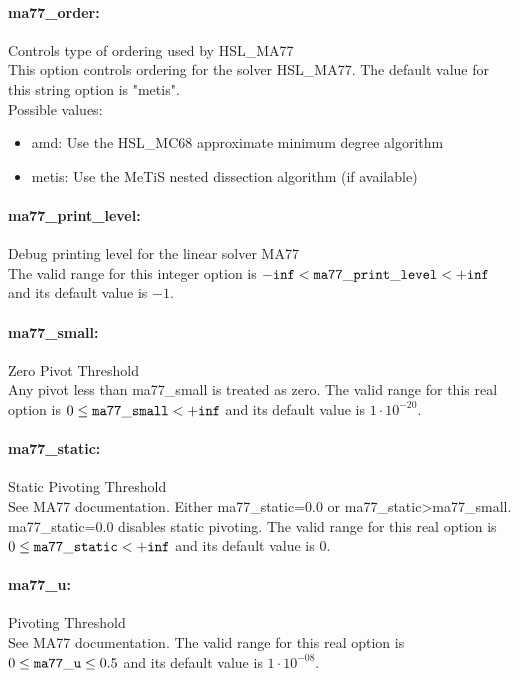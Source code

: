 \paragraph{ma77\_order:}\label{opt:ma77_order} Controls type of ordering used by HSL\_MA77 \\
 This option controls ordering for the solver HSL\_MA77. The default value for this string option is "metis".
\\ 
Possible values:
\begin{itemize}
   \item amd: Use the HSL\_MC68 approximate minimum degree algorithm
   \item metis: Use the MeTiS nested dissection algorithm (if available)
\end{itemize}

\paragraph{ma77\_print\_level:}\label{opt:ma77_print_level} Debug printing level for the linear solver MA77 \\
 The valid range for this integer option is
${\tt -inf} <  {\tt ma77\_print\_level } <  {\tt +inf}$
and its default value is $-1$.


\paragraph{ma77\_small:}\label{opt:ma77_small} Zero Pivot Threshold \\
 Any pivot less than ma77\_small is treated as zero. The valid range for this real option is 
$0 \le {\tt ma77\_small } <  {\tt +inf}$
and its default value is $1 \cdot 10^{-20}$.


\paragraph{ma77\_static:}\label{opt:ma77_static} Static Pivoting Threshold \\
 See MA77 documentation. Either ma77\_static=0.0 or ma77\_static>ma77\_small. ma77\_static=0.0 disables static pivoting. The valid range for this real option is 
$0 \le {\tt ma77\_static } <  {\tt +inf}$
and its default value is $0$.


\paragraph{ma77\_u:}\label{opt:ma77_u} Pivoting Threshold \\
 See MA77 documentation. The valid range for this real option is 
$0 \le {\tt ma77\_u } \le 0.5$
and its default value is $1 \cdot 10^{-08}$.


